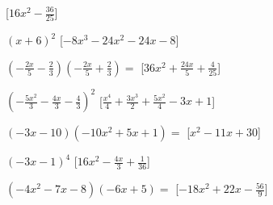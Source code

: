 \begin{esercizio}[\Ast]
\begin{enumeratea}
  \hfill [\(16 x^{2} - \frac{36}{25}\)]
\item \(\left(x + 6\right)^{2}\)
  \hfill [\(- 8 x^{3} - 24 x^{2} - 24 x - 8\)]
\item \(\left(- \frac{2 x}{5} - \frac{2}{3}\right)\left(- \frac{2 x}{5} + 
\frac{2}{3}\right)=\)
  \hfill [\(36 x^{2} + \frac{24 x}{5} + \frac{4}{25}\)]
\item \(\left(- \frac{5 x^{2}}{3} - \frac{4 x}{3} - \frac{4}{3}\right)^{2}\)
  \hfill [\(\frac{x^{4}}{4} + \frac{3 x^{3}}{2} + \frac{5 x^{2}}{4} - 3 x + 
1\)]
\item \(\left(- 3 x - 10\right)\left(- 10 x^{2} + 5 x + 1\right)=\)
  \hfill [\(x^{2} - 11 x + 30\)]
\item \(\left(- 3 x - 1\right)^{4}\)
  \hfill [\(16 x^{2} - \frac{4 x}{3} + \frac{1}{36}\)]
\item \(\left(- 4 x^{2} - 7 x - 8\right)\left(- 6 x + 5\right)=\)
  \hfill [\(- 18 x^{2} + 22 x - \frac{56}{9}\)]
 \end{enumeratea}
\end{esercizio}

